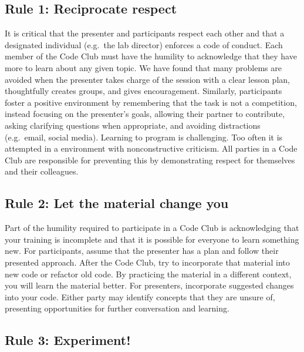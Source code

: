 \documentclass[
  11pt,
]{article}
\begin{document}
\hypertarget{rule-1-reciprocate-respect}{%
\subsection{Rule 1: Reciprocate
respect}\label{rule-1-reciprocate-respect}}

It is critical that the presenter and participants respect each other
and that a designated individual (e.g.~the lab director) enforces a code
of conduct. Each member of the Code Club must have the humility to
acknowledge that they have more to learn about any given topic. We have
found that many problems are avoided when the presenter takes charge of
the session with a clear lesson plan, thoughtfully creates groups, and
gives encouragement. Similarly, participants foster a positive
environment by remembering that the task is not a competition, instead
focusing on the presenter's goals, allowing their partner to contribute,
asking clarifying questions when appropriate, and avoiding distractions
(e.g.~email, social media). Learning to program is challenging. Too
often it is attempted in a environment with nonconstructive criticism.
All parties in a Code Club are responsible for preventing this by
demonstrating respect for themselves and their colleagues.

\hypertarget{rule-2-let-the-material-change-you}{%
\subsection{Rule 2: Let the material change
you}\label{rule-2-let-the-material-change-you}}

Part of the humility required to participate in a Code Club is
acknowledging that your training is incomplete and that it is possible
for everyone to learn something new. For participants, assume that the
presenter has a plan and follow their presented approach. After the Code
Club, try to incorporate that material into new code or refactor old
code. By practicing the material in a different context, you will learn
the material better. For presenters, incorporate suggested changes into
your code. Either party may identify concepts that they are unsure of,
presenting opportunities for further conversation and learning.

\hypertarget{rule-3-experiment}{%
\subsection{Rule 3: Experiment!}\label{rule-3-experiment}}
\end{document}
